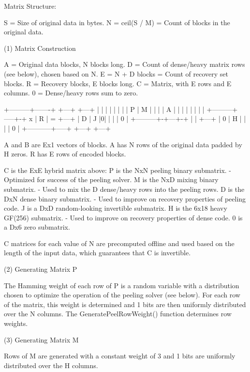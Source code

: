  Matrix Structure\+:

S = Size of original data in bytes. N = ceil(S / M) = Count of blocks in the original data.

(1) Matrix Construction \begin{DoxyVerb}A = Original data blocks, N blocks long.
D = Count of dense/heavy matrix rows (see below), chosen based on N.
E = N + D blocks = Count of recovery set blocks.
R = Recovery blocks, E blocks long.
C = Matrix, with E rows and E columns.
0 = Dense/heavy rows sum to zero.

+---------+-------+   +---+   +---+
|         |       |   |   |   |   |
|    P    |   M   |   |   |   | A |
|         |       |   |   |   |   |
+---------+-----+-+ x | R | = +---+
|    D    |  J  |0|   |   |   | 0 |
+---------+-+---+-+   |   |   +---+
|    0      |  H  |   |   |   | 0 |
+-----------+-----+   +---+   +---+

A and B are Ex1 vectors of blocks.
    A has N rows of the original data padded by H zeros.
    R has E rows of encoded blocks.

C is the ExE hybrid matrix above:
    P is the NxN peeling binary submatrix.
        - Optimized for success of the peeling solver.
    M is the NxD mixing binary submatrix.
        - Used to mix the D dense/heavy rows into the peeling rows.
    D is the DxN dense binary submatrix.
        - Used to improve on recovery properties of peeling code.
    J is a DxD random-looking invertible submatrix.
    H is the 6x18 heavy GF(256) submatrix.
        - Used to improve on recovery properties of dense code.
    0 is a Dx6 zero submatrix.

C matrices for each value of N are precomputed offline and used
based on the length of the input data, which guarantees that C
is invertible.
\end{DoxyVerb}


(2) Generating Matrix P \begin{DoxyVerb}The Hamming weight of each row of P is a random variable with a
distribution chosen to optimize the operation of the peeling
solver (see below).
For each row of the matrix, this weight is determined and 1 bits
are then uniformly distributed over the N columns.
The GeneratePeelRowWeight() function determines row weights.
\end{DoxyVerb}


(3) Generating Matrix M \begin{DoxyVerb}Rows of M are generated with a constant weight of 3 and 1 bits are
uniformly distributed over the H columns.
\end{DoxyVerb}


